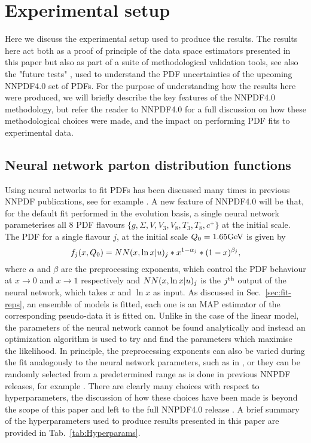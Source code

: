 \section{Experimental setup}

Here we discuss the experimental setup used to produce the results. The
results here act both as a proof of principle of the data space estimators
presented in this paper but also as part of a suite of methodological
validation tools, see also the "future tests" \cite{Cruz_Martinez_2021},
used to
understand the PDF uncertainties of the upcoming NNPDF4.0 set of PDFs.
For the purpose of understanding how the results here were produced, we
will briefly describe the key features of the NNPDF4.0 methodology,
but refer the reader to NNPDF4.0 for a full discussion on how these
methodological choices were made, and the impact on performing PDF fits
to experimental data.

\subsection{Neural network parton distribution functions}

Using neural networks to fit PDFs has been discussed many times in previous
NNPDF publications, see for example \cite{nnpdf30, Ball_2017}. A new
feature of NNPDF4.0 will be that, for the default fit performed in the
evolution basis, a
single neural network parameterises all 8 PDF flavours $\{ g, \Sigma, V, V_3, V_8, T_3, T_8, c^+ \}$
at the initial scale. The PDF for a single flavour $j$, at the initial scale
$Q_0 = 1.65 {\rm GeV}$ is given by
\begin{equation}
    f_j(x, Q_0) = NN(x, \ln x | u)_j * x^{1-\alpha_j} * (1-x)^{\beta_j},
\end{equation}
where $\alpha$ and $\beta$ are the preprocessing exponents, which control the
PDF behaviour at $x \to 0$ and $x \to 1$ respectively and
$NN(x, \ln x | u)_j$ is the
$j^{\rm th}$ output of the neural network, which takes $x$ and $\ln x$ as input.
As discussed in Sec.~\ref{sec:fit-reps}, an ensemble of models is fitted, each
one is an MAP estimator of the corresponding pseudo-data it is fitted on. Unlike
in the case of the linear model, the parameters of the neural network cannot be
found analytically and instead an optimization algorithm is used to try and
find the parameters which maximise the likelihood. In principle, the preprocessing
exponents can also be varied during the fit analogously to the neural network
parameters, such as in \cite{Carrazza_2019}, or they can be randomly selected
from a predetermined range as is done in previous NNPDF releases,
for example \cite{Ball_2017}. There are clearly many choices with respect
to hyperparameters, the discussion of how these choices have been made is
beyond the scope of this paper and left to the full NNPDF4.0 release
\cite{NNPDF40}. A brief summary of the hyperparameters used to produce results
presented in this paper are provided in Tab.~\ref{tab:Hyperparams}.

